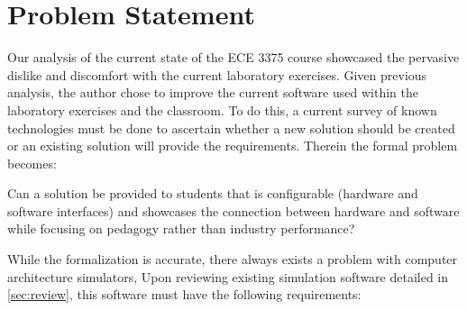 \section{Problem Statement}
\label{sec:problem-statement}

Our analysis of the current state of the ECE 3375 course showcased the pervasive dislike and discomfort with the current laboratory exercises\cite{evals:ece3375-2013, evals:ece3375-2014}. Given previous analysis, the author chose to improve the current software used within the laboratory exercises and the classroom. To do this, a current survey of known technologies must be done to ascertain whether a new solution should be created or an existing solution will provide the requirements. Therein the formal problem becomes: 
\begin{displayquote}
    Can a solution be provided to students that is configurable (hardware and software interfaces) and showcases the connection between hardware and software while focusing on pedagogy rather than industry performance? 
\end{displayquote}
While the formalization is accurate, there always exists a problem with computer architecture simulators,
 Upon reviewing existing simulation software detailed in \cref{sec:review}, this software must have the following requirements: 

